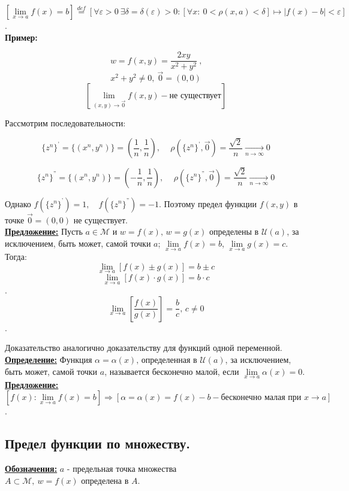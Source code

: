 \documentclass[a4paper,12pt]{article} %
\begin{document}
	$[\lim\limits_{x \to a}f(x) = b] \stackrel{def}{=} \left[\forall \varepsilon > 0 ~ 
	\exists\delta = \delta(\varepsilon) > 0: 
	[\forall x: ~ 0 < \rho (x, a) < \delta] \mapsto |f(x) - b| < \varepsilon\right]$. \\
	
	\textbf{Пример:}
	
	$$w = f(x, y) = \frac{2xy}{x^2 + y^2} ~ \text{,}$$
	$$x^2 + y^2 \neq 0, ~ \vec{0} = (0, 0)$$
	$$[\lim\limits_{(x,y) \to \vec{0}}f(x, y) - \text{не существует}]$$
	
	Рассмотрим последовательности:
	
	$$\{z^n\}^\text{'} = \{(x^n, y^n)\} = \left(\frac{1}{n}, \frac{1}{n}\right) \text{, } \quad \rho(\{z^n\}^\text{'}, \vec{0}) = \frac{\sqrt2}{n} \xrightarrow[n \rightarrow \infty]{} 0$$
	
	$$\{z^n\}^\text{''} = \{(x^n, y^n)\} = \left(-\frac{1}{n}, \frac{1}{n}\right) \text{, } \quad \rho(\{z^n\}^\text{''}, \vec{0}) = \frac{\sqrt2}{n} \xrightarrow[n \rightarrow \infty]{} 0$$
	
	Однако $f(\{z^n\}^\text{'}) = 1, \quad f(\{z^n\}^\text{''}) = -1$. Поэтому предел функции $f(x, y)$ в точке $\vec{0} = (0, 0)$ не существует.\\
	
	\underline{\textbf{Предложение:}} Пусть $a \in \mathscr{M} \text{ и } w = f(x) \text{, } w = g(x)$ определены
	в $\mathscr{U}(a)$, за исключением, быть может, самой точки $a$;
	$\lim\limits_{x \to a}f(x) = b$, $\lim\limits_{x \to a}g(x) = c$. Тогда:
	$$\lim\limits_{x \to a}[f(x) \pm g(x) ] = b \pm c$$
	$$\lim\limits_{x \to a}[f(x) \cdot g(x) ] = b \cdot c$$.
	$$\lim\limits_{x \to a}\left[\frac{f(x)}{g(x)}\right] = \frac{b}{c} \text{, } c \neq 0$$.
	
	Доказательство аналогично доказательству для функций одной переменной.\\
	
	\underline{\textbf{Определение:}} Функция $\alpha = \alpha(x) \text{, определенная в }\mathscr{U}(a)$,
	за исключением, быть может, самой точки $a$, называется бесконечно малой, если
	$\lim\limits_{x \to a}\alpha(x) = 0$.\\
	
	\underline{\textbf{Предложение:}}
	\\  [2 mm]
	$[f(x): \lim\limits_{x \to a}f(x) = b] \Rightarrow 
	[\alpha = \alpha(x) = f(x) - b -\text{бесконечно малая при } x \rightarrow a]$.\\
	
	\subsection{Предел функции по множеству.}
	\underline{\textbf{Обозначения:}}
	$a$ - предельная точка множества $A \subset \mathscr{M}, ~ w = f(x) \text{ определена в } A$. \\
	
\end{document}
